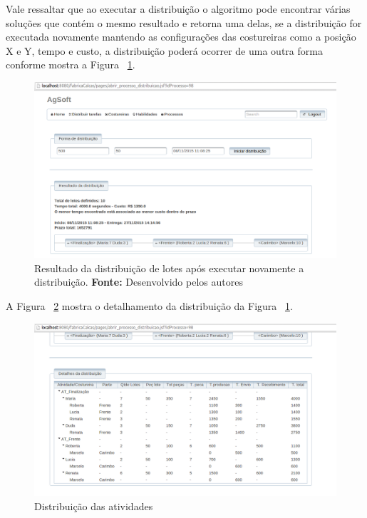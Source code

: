 \par Vale ressaltar que ao executar a distribuição o algoritmo pode
encontrar várias soluções que contém o mesmo resultado e retorna uma delas, se a
distribuição for executada novamente mantendo as configurações das costureiras
como a posição X e Y, tempo e custo, a distribuição poderá ocorrer de uma outra
forma conforme mostra a Figura ~\ref{fig:resultado2_teste5}.

\newpage

\begin{figure}[h!]
	\centerline{\includegraphics[scale=0.3]{./imagens/resultado2_teste5.png}}
	\caption[Resultado da distribuição de lotes após executar novamente a
	distribuição.]
	{Resultado da distribuição de lotes após executar novamente a
	distribuição. \textbf{Fonte:} Desenvolvido pelos autores}
	\label{fig:resultado2_teste5}
\end{figure}


\par A Figura ~\ref{fig:detalhamento2_teste5} mostra o detalhamento da
distribuição da Figura ~\ref{fig:resultado2_teste5}.



\begin{figure}[h!]
	\centerline{\includegraphics[scale=0.3]{./imagens/detalhamento2_teste5.png}}
	\caption[Distribuição das atividades] 
	{Distribuição das atividades}
	\label{fig:detalhamento2_teste5}
\end{figure}


